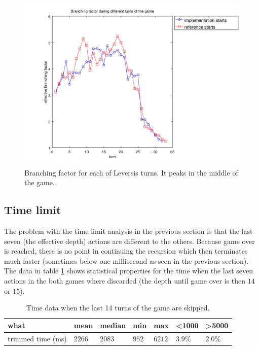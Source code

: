 \documentclass[a4paper,11pt]{article}
\begin{document}
\begin{figure}

\centering
\includegraphics[scale=0.78]{branchingLegend.png}

\caption{Branching factor for each of Leversis turns. It peaks in the middle of the game.} \label{fig:branching}

\end{figure}

\subsection{Time limit}
The problem with the time limit analysis in the previous section is that the last seven (the effective depth) actions are different to the others. Because game over is reached, there is no point in continuing the recursion which then terminates much faster (sometimes below one millisecond as seen in the previous section). The data in table \ref{tab:trimmed} shows statistical properties for the time when the last seven actions in the both games where discarded (the depth until game over is then $14$ or $15$).

\begin{table}

\centering
\begin{tabular}{|l|l|l|l|l|l|l|}
\hline
\textbf{what} & \textbf{mean} & \textbf{median} & \textbf{min} & \textbf{max} & \textbf{<1000} & \textbf{>5000}
\\ \hline
trimmed time (ms) & $2266$ & $2083$ & $952$ & $6212$ & $3.9\%$ & $2.0\%$
\\ \hline
\end{tabular}

\caption{Time data when the last 14 turns of the game are skipped.} \label{tab:trimmed}

\end{table}
\end{document}
